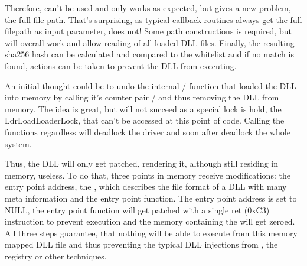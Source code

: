 Therefore,  can't be used and only  works as expected, but gives a new problem, the full file path. That's surprising, as typical callback routines always get the full filepath as input parameter,  does not! Some path constructions is required, but will overall work and allow reading of all loaded DLL files. Finally, the resulting sha256 hash can be calculated and compared to the whitelist and if no match is found, actions can be taken to prevent the DLL from executing. 

An initial thought could be to undo the internal  /  function that loaded the DLL into memory by calling it's counter pair  /  and thus removing the DLL from memory. The idea is great, but will not succeed as a special lock is hold, the LdrLoadLoaderLock, that can't be accessed at this point of code. Calling the functions regardless will deadlock the driver and soon after deadlock the whole system.

Thus, the DLL will only get patched, rendering it, although still residing in memory, useless. To do that, three points in memory receive modifications: the entry point address, the , which describes the file format of a DLL with many meta information and the entry point function. The entry point address is set to NULL, the entry point function will get patched with a single ret (0xC3) instruction to prevent execution and the memory containing the  will get zeroed. All three steps guarantee, that nothing will be able to execute from this memory mapped DLL file and thus preventing the typical DLL injections from , the registry or other techniques.